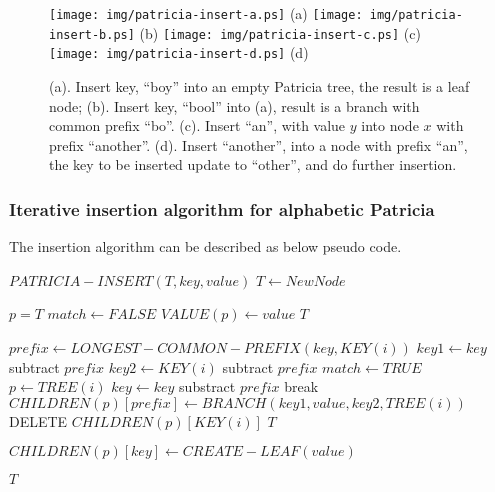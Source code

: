 \documentclass{article}
\begin{document}
\begin{figure}[htbp]
       \begin{center}
	\texttt{[image: img/patricia-insert-a.ps]} (a)
	\texttt{[image: img/patricia-insert-b.ps]} (b)
	\texttt{[image: img/patricia-insert-c.ps]} (c)
	\texttt{[image: img/patricia-insert-d.ps]} (d)
        \caption{(a). Insert key, ``boy'' into an empty Patricia tree,
	the result is a leaf node; \newline
	(b). Insert key, ``bool'' into (a), result is a branch with
	common prefix ``bo''. \newline
        (c). Insert ``an'', with value $y$ into node $x$ with prefix
	``another''. \newline
        (d). Insert ``another'', into a node with prefix ``an'', the key to be inserted update to ``other'', and do further insertion.}
        \label{fig:patricia-insert}
       \end{center}
\end{figure}

\subsubsection{Iterative insertion algorithm for alphabetic Patricia}

The insertion algorithm can be described as below pseudo code.

\begin{algorithmic}
\STATE $PATRICIA-INSERT(T, key, value)$
   \STATE $T \leftarrow NewNode$ \ENDIF

  \STATE $p=T$
  \LOOP
    \STATE $match \leftarrow FALSE$
        \STATE $VALUE(p) \leftarrow value$
        \RETURN $T$
      \ENDIF

      \STATE $prefix \leftarrow LONGEST-COMMON-PREFIX(key, KEY(i))$
      \STATE $key1 \leftarrow key$ subtract $prefix$
      \STATE $key2 \leftarrow KEY(i)$ subtract $prefix$
        \STATE $match \leftarrow TRUE$
          \STATE $p \leftarrow TREE(i)$
          \STATE $key \leftarrow key$ substract $prefix$
          \STATE break
        \ELSE
          \STATE $CHILDREN(p)[prefix] \leftarrow BRANCH(key1, value, key2, TREE(i))$
          \STATE DELETE $CHILDREN(p)[KEY(i)]$
          \RETURN $T$
        \ENDIF
      \ENDIF

        \STATE $CHILDREN(p)[key] \leftarrow CREATE-LEAF(value)$
      \ENDIF
    \ENDFOR

  \ENDLOOP
  \RETURN $T$
\end{algorithmic}
\end{document}
